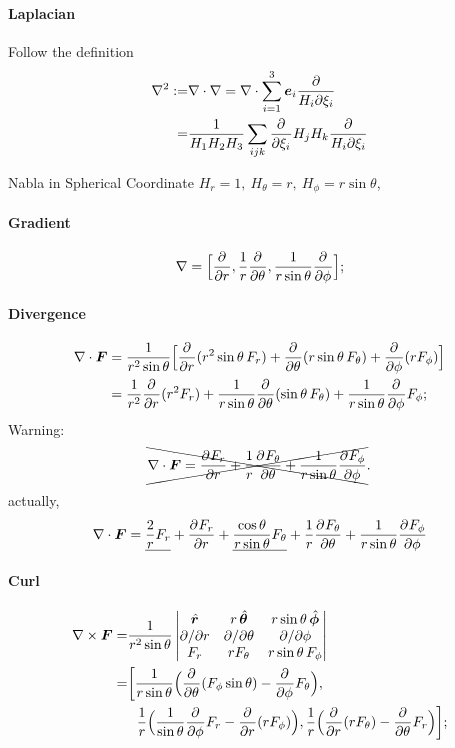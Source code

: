 \documentclass{article}
\begin{document}
\paragraph{Laplacian} Follow the definition
\begin{align*}
	\nabla^2:= & \nabla\cdot\nabla=\nabla\cdot\sum_{i=1}^3\bm e_i\frac\partial{H_i\partial\xi_i} \\
	=          & \frac1{H_1H_2H_3}\sum_{ijk}\frac{\partial^{}}{\partial{\xi_i}^{}}H_jH_k\frac{\partial}{H_i\partial\xi_i}
\end{align*}
\begin{example}{Nabla in Spherical Coordinate}{}
	$H_r=1,~H_\theta=r,~H_\phi=r\sin\theta$,
	\paragraph{Gradient}
	$$\nabla=\Bigl[\frac{\partial^{}}{\partial{r}^{}},\frac1r\frac{\partial^{}}{\partial{\theta}^{}},\frac1{r\sin\theta}\frac{\partial^{}}{\partial{\phi}^{}}\Bigr];$$
	\paragraph{Divergence}
	\begin{align*}
		\nabla\cdot\bm F & =\frac1{r^2\sin\theta}\Bigl[\frac{\partial^{}}{\partial{r}^{}}(r^2\sin\theta\,F_r)+\frac{\partial^{}}{\partial{\theta}^{}}(r\sin\theta\,F_\theta)+\frac{\partial^{}}{\partial{\phi}^{}}(rF_\phi)\Bigr]      \\
		                 & =\frac1{r^2}\frac{\partial^{}}{\partial{r}^{}}(r^2F_r)+\frac1{r\sin\theta}\frac{\partial^{}}{\partial{\theta}^{}}(\sin\theta\,F_\theta)+\frac1{r\sin\theta}\frac{\partial^{}}{\partial{\phi}^{}} F_\phi;
	\end{align*}
	Warning:
	$$\xcancel{\nabla\cdot\bm F=\frac{\partial^{}F_r}{\partial{r}^{}}+\frac1r\frac{\partial^{}F_\theta}{\partial{\theta}^{}}+\frac1{r\sin\theta}\frac{\partial^{}F_\phi}{\partial{\phi}^{}}}.$$
	actually,
	$$\nabla\cdot\bm F=\underline{\frac2rF_r}+\frac{\partial^{}F_r}{\partial{r}^{}}+\underline{\frac{\cos\theta}{r\sin\theta}F_\theta}+\frac1r\frac{\partial^{}F_\theta}{\partial{\theta}^{}}+\frac1{r\sin\theta}\frac{\partial^{}F_\phi}{\partial{\phi}^{}}$$
	\paragraph{Curl}
	\begin{align*}
		\nabla\times\bm F= & \frac1{r^2\sin\theta}
		\begin{vmatrix}
			\mathop{}\!\hat{\bm{r}}              & r\mathop{}\!\hat{\bm{\theta}}             & r\sin\theta\mathop{}\!\hat{\bm{\phi}}   \\
			\partial/\partial r & \partial/\partial\theta & \partial/\partial\phi \\
			F_r                 & rF_\theta               & r\sin\theta\,F_\phi
		\end{vmatrix}                                                                                                                    \\
		=                  & \biggl[\frac1{r\sin\theta}\Bigl(\frac{\partial^{}}{\partial{\theta}^{}}(F_\phi\sin\theta)-\frac{\partial^{}}{\partial{\phi}^{}} F_\theta\Bigr),                                    \\
		                   & ~~\frac1r\Bigl(\frac1{\sin\theta}\frac{\partial^{}}{\partial{\phi}^{}} F_r-\frac{\partial^{}}{\partial{r}^{}}(rF_\phi)\Bigr),\frac1r\Bigl(\frac{\partial^{}}{\partial{r}^{}}(rF_\theta)-\frac{\partial^{}}{\partial{\theta}^{}} F_r\Bigr)\biggr];
	\end{align*}

\end{example}
\end{document}
